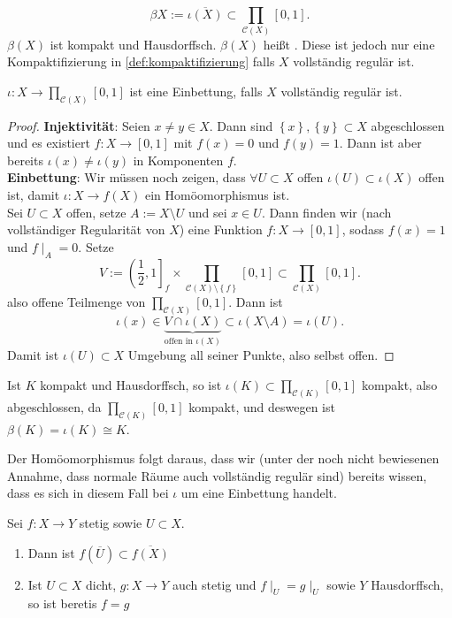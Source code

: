 \[
    βX := \overline{ι(X)} \subset \prod_{\mathcal{C}(X)} [0,1]
.\] 
$β(X)$ ist kompakt und Hausdorffsch. $β(X)$ heißt  . Diese ist jedoch nur eine Kompaktifizierung in \autoref{def:kompaktifizierung} falls $X$ vollständig regulär ist.
\begin{theorem}\label{thm:stone-cech-kompaktifizierung-ist-einbettung-für-vollständig-reguläre-räume}
     $ι: X \to  \prod_{\mathcal{C}(X)}[0,1]$ ist eine Einbettung, falls $X$ vollständig regulär ist.
\end{theorem}
\begin{proof}
    \textbf{Injektivität}: Seien $x\neq y\in X$. Dann sind $\left \{x\right\} ,\left \{y\right\} \subset X$ abgeschlossen und es existiert $f: X \to  [0,1]$ mit $f(x) = 0$ und  $f(y) = 1$. Dann ist aber bereits  $ι(x) \neq  ι(y)$ in Komponenten $f$. \\
    \textbf{Einbettung}: Wir müssen noch zeigen, dass $\forall  U\subset X$ offen $ι(U) \subset ι(X)$ offen ist, damit $ι : X \to  f(X)$ ein Homöomorphismus ist. \\
    Sei $U\subset X$ offen, setze $A := X\setminus U$ und sei $x\in U$. Dann finden wir (nach vollständiger Regularität von $X$) eine Funktion  $f: X \to  [0,1]$, sodass $f(x) = 1$ und  $f\mid _{A} = 0$. Setze
    \[
        V := \left( \frac{1}{2},1 \right]_f \times \prod_{\mathcal{C}(X) \setminus \left \{f\right\} } [0,1] \subset \prod_{\mathcal{C}(X)} [0,1]
    .\] 
    also offene Teilmenge von $\prod_{\mathcal{C}(X)} [0,1]$. Dann ist
    \[
        ι(x) \in \underbrace{V \cap  ι(X)}_{\text{offen in } ι(X)} \subset ι(X \setminus A) = ι(U)
    .\] 
    Damit ist $ι(U)\subset X$ Umgebung all seiner Punkte, also selbst offen.
\end{proof}
\begin{remark}
    Ist $K$ kompakt und Hausdorffsch, so ist  $ι(K) \subset \prod_{\mathcal{C}(K)} [0,1]$ kompakt, also abgeschlossen, da $\prod_{\mathcal{C}(K)} [0,1]$ kompakt, und deswegen ist $β(K) = ι(K) \cong K$.
\end{remark}
\begin{remark*}
    Der Homöomorphismus folgt daraus, dass wir (unter der noch nicht bewiesenen Annahme, dass normale Räume auch vollständig regulär sind) bereits wissen, dass es sich in diesem Fall bei $ι$ um eine Einbettung handelt.
\end{remark*}
\begin{lemma}\label{lm:fortsetzung-stetiger-funktionen-in-dichten-hausdorff-räumen-sind-eindeutig}
   Sei $f: X \to  Y$ stetig sowie $U\subset X$.
   \begin{enumerate}[1)]
       \item Dann ist $f(\overline{U}) \subset \overline{f(X)}$ 
       \item Ist $U\subset X$ dicht, $g: X\to Y$ auch stetig und $f\mid _ U = g\mid _U$ sowie $Y$ Hausdorffsch, so ist beretis  $f=g$
   \end{enumerate}
\end{lemma}
